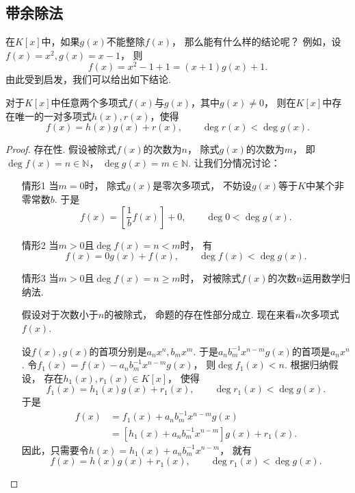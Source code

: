 \subsection{带余除法}
在\(K[x]\)中，如果\(g(x)\)不能整除\(f(x)\)，
那么能有什么样的结论呢？
例如，设\(f(x)=x^2,
g(x)=x-1\)，
则\[
	f(x)=x^2-1+1=(x+1)g(x)+1.
\]
由此受到启发，我们可以给出如下结论.
\begin{theorem}\label{theorem:多项式.带余除法}
对于\(K[x]\)中任意两个多项式\(f(x)\)与\(g(x)\)，其中\(g(x)\neq0\)，
则在\(K[x]\)中存在唯一的一对多项式\(h(x),r(x)\)，使得\[
	f(x) = h(x) g(x) + r(x),
	\qquad
	\deg r(x) < \deg g(x).
\]
\begin{proof}
存在性.
假设被除式\(f(x)\)的次数为\(n\)，
除式\(g(x)\)的次数为\(m\)，
即\(\deg f(x)=n\in\mathbb{N}\)，
\(\deg g(x)=m\in\mathbb{N}\).
让我们分情况讨论：\begin{enumerate}
	\item[情形1]
	当\(m=0\)时，
	除式\(g(x)\)是零次多项式，
	不妨设\(g(x)\)等于\(K\)中某个非零常数\(b\).
	于是\[
		f(x) = \left[ \frac1b f(x) \right] + 0,
		\qquad
		\deg 0 < \deg g(x).
	\]

	\item[情形2]
	当\(m>0\)且\(\deg f(x) = n < m\)时，
	有\[
		f(x) = 0 g(x) + f(x), \qquad
		\deg f(x) < \deg g(x).
	\]

	\item[情形3]
	当\(m>0\)且\(\deg f(x) = n \geq m\)时，
	对被除式\(f(x)\)的次数\(n\)运用数学归纳法.

	假设对于次数小于\(n\)的被除式，
	命题的存在性部分成立.
	现在来看\(n\)次多项式\(f(x)\).

	设\(f(x),g(x)\)的首项分别是\(a_n x^n,b_m x^m\).
	于是\(a_n b_m^{-1} x^{n-m} g(x)\)的首项是\(a_n x^n\).
	令\(f_1(x) = f(x) - a_n b_m^{-1} x^{n-m} g(x)\)，
	则\(\deg f_1(x) < n\).
	根据归纳假设，
	存在\(h_1(x),r_1(x) \in K[x]\)，
	使得\[
		f_1(x) = h_1(x) g(x) + r_1(x), \qquad
		\deg r_1(x) < \deg g(x).
	\]
	于是\begin{align*}
		f(x)
		&= f_1(x) + a_n b_m^{-1} x^{n-m} g(x) \\
		&= [h_1(x) + a_n b_m^{-1} x^{n-m}] g(x) + r_1(x).
	\end{align*}
	因此，只需要令\(h(x) = h_1(x) + a_n b_m^{-1} x^{n-m}\)，
	就有\[
		f(x) = h(x) g(x) + r_1(x),
		\qquad
		\deg r_1(x) < \deg g(x).
	\]
\end{enumerate}


\end{proof}
\end{theorem}
